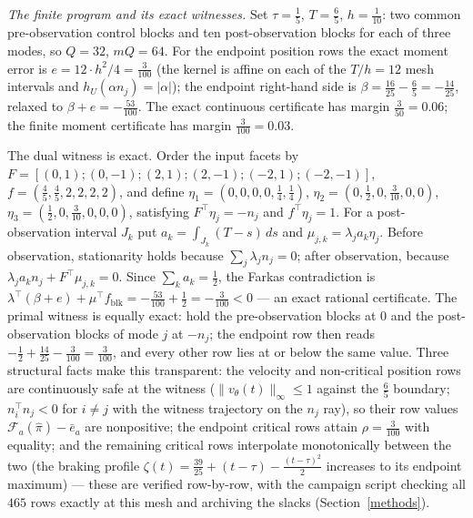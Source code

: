 \documentclass[10pt,twocolumn]{article}
\theoremstyle{plain}
\theoremstyle{definition}
\theoremstyle{remark}
\begin{document}
\emph{The finite program and its exact witnesses.} Set
\(\tau = \tfrac15\), \(T = \tfrac65\), \(h = \tfrac1{10}\): two common
pre-observation control blocks and ten post-observation blocks for each of
three modes, so \(Q = 32\), \(mQ = 64\). For the endpoint position rows the
exact moment error is \(e = 12 \cdot h^2/4 = \tfrac{3}{100}\) (the kernel is
affine on each of the \(T/h = 12\) mesh intervals and
\(h_U(\alpha n_j) = |\alpha|\)); the endpoint right-hand side is
\(\beta = \tfrac{16}{25} - \tfrac65 = -\tfrac{14}{25}\), relaxed to
\(\beta + e = -\tfrac{53}{100}\). The exact continuous certificate has
margin \(\tfrac{3}{50} = 0.06\); the finite moment certificate has margin
\(\tfrac{3}{100} = 0.03\).

The dual witness is exact. Order the input facets by
\(F = [(0,1);(0,-1);(2,1);(2,-1);(-2,1);(-2,-1)]\),
\(f = (\tfrac45, \tfrac45, 2, 2, 2, 2)\), and define
\(\eta_1 = (0,0,0,0,\tfrac14,\tfrac14)\),
\(\eta_2 = (0,\tfrac12,0,\tfrac3{10},0,0)\),
\(\eta_3 = (\tfrac12,0,\tfrac3{10},0,0,0)\), satisfying
\(F^\top \eta_j = -n_j\) and \(f^\top \eta_j = 1\). For a post-observation
interval \(J_k\) put \(a_k = \int_{J_k} (T - s)\, ds\) and
\(\mu_{j,k} = \lambda_j a_k \eta_j\). Before observation, stationarity holds
because \(\sum_j \lambda_j n_j = 0\); after observation, because
\(\lambda_j a_k n_j + F^\top \mu_{j,k} = 0\). Since
\(\sum_k a_k = \tfrac12\), the Farkas contradiction is
\(\lambda^\top(\beta + e) + \mu^\top f_{\mathrm{blk}} = -\tfrac{53}{100} +
\tfrac12 = -\tfrac{3}{100} < 0\) --- an exact rational certificate. The
primal witness is equally exact: hold the pre-observation blocks at \(0\) and
the post-observation blocks of mode \(j\) at \(-n_j\); the endpoint row then
reads \(-\tfrac12 + \tfrac{14}{25} - \tfrac{3}{100} = \tfrac{3}{100}\), and
every other row lies at or below the same value. Three structural facts
make this transparent: the velocity and non-critical position rows are
continuously safe at the witness (\(\|v_\theta(t)\|_\infty \le 1\)
against the \(\tfrac65\) boundary; \(n_i^\top n_j < 0\) for
\(i \ne j\) with the witness trajectory on the \(n_j\) ray), so their
row values \(\mathcal F_a(\hat\pi) - \bar e_a\) are nonpositive; the
endpoint critical rows attain \(\rho = \tfrac3{100}\) with equality; and
the remaining critical rows interpolate monotonically between the two
(the braking profile \(\zeta(t) = \tfrac{39}{25} + (t - \tau) -
\tfrac{(t-\tau)^2}{2}\) increases to its endpoint maximum) --- these are
verified row-by-row, with the campaign script checking all \(465\) rows
exactly at this mesh and archiving the slacks
(Section~\ref{methods}).
\end{document}
